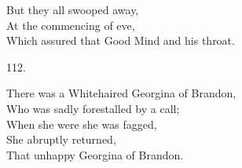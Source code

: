 \documentclass{book}
\begin{document}
{\hspace*{14mm}       But they all swooped away, \\
\hspace*{14mm}       At the commencing of eve, \\
\hspace*{14mm}       Which assured that Good Mind and his throat.
\begin{center}
    112.
\end{center}
\par
\noindent
\hspace*{14mm}       There was a Whitehaired Georgina of Brandon, \\
\hspace*{14mm}       Who was sadly forestalled by a call; \\
\hspace*{14mm}       When she were she was fagged, \\
\hspace*{14mm}       She abruptly returned, \\
\hspace*{14mm}       That unhappy Georgina of Brandon.
\newpage
}
\end{document}
